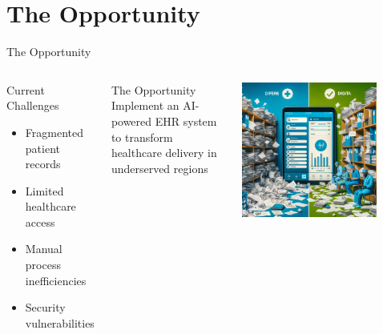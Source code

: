 \documentclass[aspectratio=169]{beamer}
\begin{document}
\section{The Opportunity}
\begin{frame}{The Opportunity}
    \begin{columns}[T]
            \begin{block}{Current Challenges}
                \begin{itemize}
                    \item Fragmented patient records
                    \item Limited healthcare access
                    \item Manual process inefficiencies
                    \item Security vulnerabilities
                \end{itemize}
            \end{block}
            
            \begin{alertblock}{The Opportunity}
                Implement an AI-powered EHR system to transform healthcare delivery in underserved regions
            \end{alertblock}
            \includegraphics[width=0.8\textwidth]{intro_illustration.png}
    \end{columns}
\end{frame}

\end{document}
